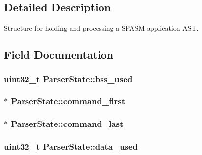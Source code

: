 \subsection{\-Detailed \-Description}
\-Structure for holding and processing a \-S\-P\-A\-S\-M application \-A\-S\-T. 

\subsection{\-Field \-Documentation}
\hypertarget{struct_parser_state_ac10c4556abd95773deb418ef3b26fab8}{
\subsubsection[{bss\-\_\-used}]{\setlength{\rightskip}{0pt plus 5cm}uint32\-\_\-t {\bf \-Parser\-State\-::bss\-\_\-used}}}
\label{struct_parser_state_ac10c4556abd95773deb418ef3b26fab8}
\hypertarget{struct_parser_state_a23889d26f95df19cf4fad8ca001a343f}{
\subsubsection[{command\-\_\-first}]{$\ast$ {\bf \-Parser\-State\-::command\-\_\-first}}}
\label{struct_parser_state_a23889d26f95df19cf4fad8ca001a343f}
\hypertarget{struct_parser_state_abdb676c62455b934215960211eedc209}{
\subsubsection[{command\-\_\-last}]{$\ast$ {\bf \-Parser\-State\-::command\-\_\-last}}}
\label{struct_parser_state_abdb676c62455b934215960211eedc209}
\hypertarget{struct_parser_state_a228f3fe68f7d2f6b722f8ab6d2d6546a}{
\subsubsection[{data\-\_\-used}]{\setlength{\rightskip}{0pt plus 5cm}uint32\-\_\-t {\bf \-Parser\-State\-::data\-\_\-used}}}
